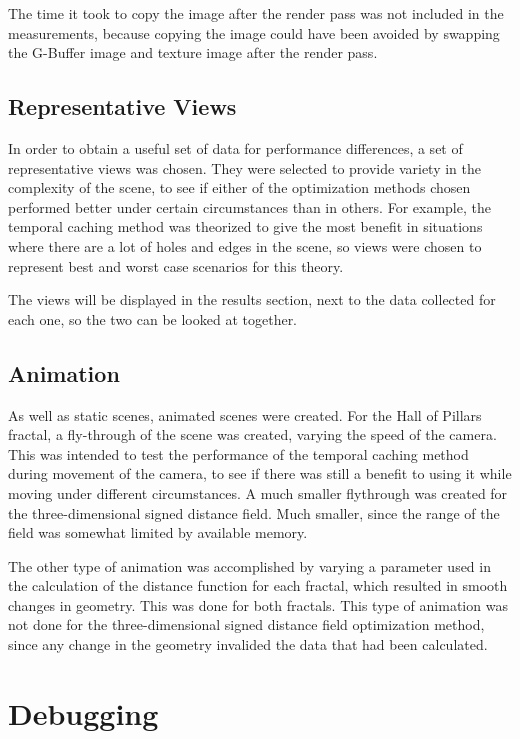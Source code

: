 The time it took to copy the image after the render pass was not included in the measurements, because copying the image could have been avoided by swapping the G-Buffer image and texture image after the render pass.

\subsection{Representative Views}

In order to obtain a useful set of data for performance differences, a set of representative views was chosen. They were selected to provide variety in the complexity of the scene, to see if either of the optimization methods chosen performed better under certain circumstances than in others. For example, the temporal caching method was theorized to give the most benefit in situations where there are a lot of holes and edges in the scene, so views were chosen to represent best and worst case scenarios for this theory.\newline

The views will be displayed in the results section, next to the data collected for each one, so the two can be looked at together.

\subsection{Animation}

As well as static scenes, animated scenes were created. For the Hall of Pillars fractal, a fly-through of the scene was created, varying the speed of the camera. This was intended to test the performance of the temporal caching method during movement of the camera, to see if there was still a benefit to using it while moving under different circumstances. A much smaller flythrough was created for the three-dimensional signed distance field. Much smaller, since the range of the field was somewhat limited by available memory.\newline

The other type of animation was accomplished by varying a parameter used in the calculation of the distance function for each fractal, which resulted in smooth changes in geometry. This was done for both fractals. This type of animation was not done for the three-dimensional signed distance field optimization method, since any change in the geometry invalided the data that had been calculated.

\section{Debugging}

